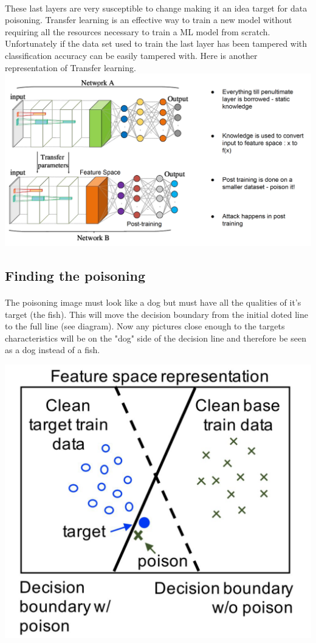 \documentclass[twoside]{article}
\begin{document}
\paragraph{}
These last layers are very susceptible to change making it an idea target for data poisoning. Transfer learning is an effective way to train a new model without requiring all the resources necessary to train a ML model from scratch. Unfortunately if the data set used to train the last layer has been tampered with classification accuracy can be easily tampered with. Here is another representation of Transfer learning. \\
\includegraphics[scale=0.3]{MLTransfer2.png}

\subsection{Finding the poisoning}
\paragraph{}
The poisoning image must look like a dog but must have all the qualities of it's target (the fish). This will move the decision boundary from the initial doted line to the full line (see diagram). Now any pictures close enough to the targets characteristics will be on the "dog" side of the decision line and therefore be seen as a dog instead of a fish.

\includegraphics[scale=0.3]{DataLinePoison.png}
\end{document}

